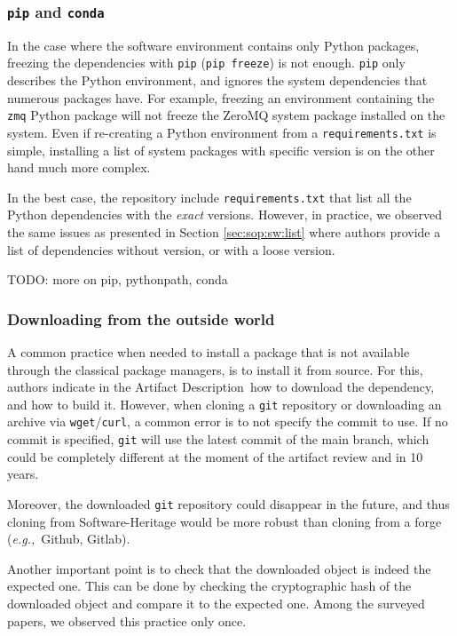 \documentclass[sigconf]{acmart}
\newcommand{\eg}{\emph{e.g.,}}
\newcommand{\ad}{Artifact Description}
\newcommand{\todo}[1]{{\color{red}TODO: #1}}
\begin{document}
\subsubsection{\texttt{pip} and \texttt{conda}}

In the case where the software environment contains only Python packages, freezing the dependencies with \texttt{pip} (\texttt{pip freeze}) is not enough.
\texttt{pip} only describes the Python environment, and ignores the system dependencies that numerous packages have. 
For example, freezing an environment containing the \texttt{zmq} Python package will not freeze the ZeroMQ system package installed on the system.  
Even if re-creating a Python environment from a \texttt{requirements.txt} is simple, installing a list of system packages with specific version is on the other hand much more complex.

In the best case, the repository include \texttt{requirements.txt} that list all the Python dependencies with the \emph{exact} versions.
However, in practice, we observed the same issues as presented in Section \ref{sec:sop:sw:list} where authors provide a list of dependencies without version, or with a loose version.

\todo{more on pip, pythonpath, conda}

\subsubsection{Downloading from the outside world}

A common practice when needed to install a package that is not available through the classical package managers, is to install it from source.
For this, authors indicate in the \ad\ how to download the dependency, and how to build it.
However, when cloning a \texttt{git} repository or downloading an archive via \texttt{wget}/\texttt{curl}, a common error is to not specify the commit to use.
If no commit is specified, \texttt{git} will use the latest commit of the main branch, which could be completely different at the moment of the artifact review and in 10 years.

Moreover, the downloaded \texttt{git} repository could disappear in the future, and thus cloning from Software-Heritage would be more robust than cloning from a forge (\eg\ Github, Gitlab).

Another important point is to check that the downloaded object is indeed the expected one.
This can be done by checking the cryptographic hash of the downloaded object and compare it to the expected one.
Among the surveyed papers, we observed this practice only once.
\end{document}
